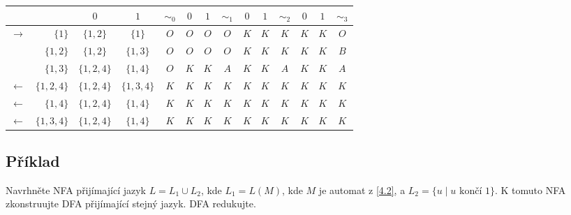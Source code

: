 \begin{center}
    \begin{tabular}{|r r|c c||c|c c||c|c c||c|c c|| c |}
        \hline
        & & $ 0 $ & $ 1 $ & $ \sim_0 $ & $ 0 $ & $ 1 $ & $ \sim_1 $ & $ 0 $ & $ 1 $ & $ \sim_2 $ & $ 0 $ & $ 1 $ & $\sim_3$ \\ \hline \hline
        $\to$ & $\{1\}$ & $\{1,2\}$ & $\{1\}$ & $O$ & $O$ & $O$ & $O$ & $K$ & $K$ & $K$ & $K$ & $K$ & $O$\\
        & $\{1,2\}$& $\{1, 2\}$ & $\{1, 3\}$ & $O$ & $O$ & $O$ & $O$ & $K$ & $K$ & $K$ & $K$ & $K$ & $B$ \\
        & $\{1,3\}$& $\{1, 2, 4\}$ & $\{1,4\}$ & $O$ & $K$ & $K$ & $A$ & $K$ & $K$ & $A$ & $K$ & $K$ & $A$ \\
        $\gets$ & $\{1,2,4\}$& $\{1, 2, 4\}$ & $\{1, 3, 4\}$ & $K$ & $K$ & $K$ & $K$ & $K$ & $K$ & $K$ & $K$ & $K$ & $K$\\
        $\gets$ & $\{1,4\}$ & $\{1,2, 4\}$ & $\{1, 4\}$ & $K$ & $K$ & $K$ & $K$ & $K$ & $K$ & $K$ & $K$ & $K$ & $K$ \\
        $\gets$ & $\{1, 3, 4\}$& $\{1, 2, 4\}$ & $\{1, 4\}$ & $K$ & $K$ & $K$ & $K$ & $K$ & $K$ & $K$ & $K$ & $K$ & $K$ \\
        \hline
    \end{tabular}

\medskip


\end{center}

\subsection{Příklad}
Navrhněte NFA přijímající jazyk $L= L_1 \cup L_2$, kde $L_1 = L(M)$, kde $M$ je automat z \ref{4.2}, a
${L_2 = \{u \mid u \text{ končí } 1\}}$. K tomuto NFA zkonstruujte DFA přijímající stejný jazyk. DFA redukujte.


